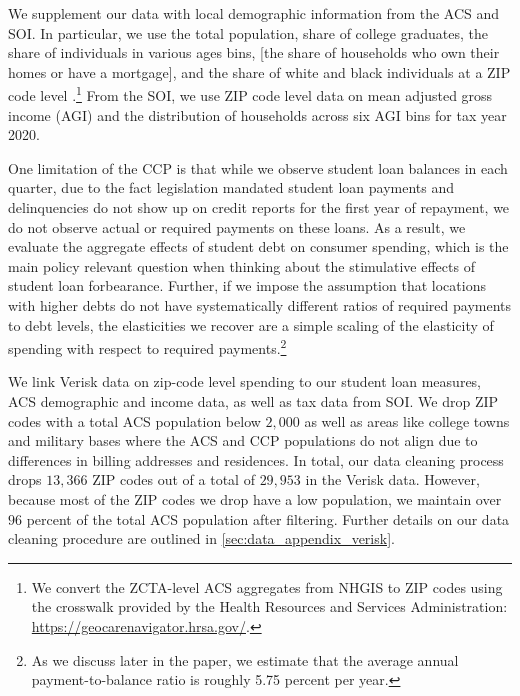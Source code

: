 \documentclass[12pt]{article}
\begin{document}
We supplement our data with local demographic information from  the ACS and SOI.  In particular, we use the total population, share of college graduates, the share of individuals in various ages bins, [the share of households who own their homes or have a mortgage], and the share of white and black individuals at a ZIP code level \citep{ACS_NHGIS}.\footnote{We convert the ZCTA-level ACS aggregates from NHGIS to ZIP codes using the crosswalk provided by the Health Resources and Services Administration: \url{https://geocarenavigator.hrsa.gov/}.}  From the SOI, we use ZIP code level data on mean adjusted gross income (AGI) and the distribution of households across six AGI bins for tax year 2020.%

One limitation of the CCP is that while we observe student loan balances in each quarter, due to the fact legislation mandated student loan payments and delinquencies do not show up on credit reports for the first year of repayment, we do not observe actual or required payments on these loans. As a result, we evaluate the aggregate effects of student debt on consumer spending, which is the main policy relevant question when thinking about the stimulative effects of student loan forbearance. Further, if we impose the assumption that locations with higher debts do not have systematically different ratios of required payments to debt levels, the elasticities we recover are a simple scaling of the elasticity of spending with respect to required payments.\footnote{As we discuss later in the paper, we estimate that the average annual payment-to-balance ratio is roughly 5.75 percent per year.} 

We link Verisk data on zip-code level spending to our student loan measures, ACS demographic and income data, as well as tax data from SOI.  We drop ZIP codes with a total ACS population below $2,000$ as well as areas like college towns and military bases where the ACS and CCP populations do not align due to differences in billing addresses and residences.  In total, our data cleaning process drops $13,366$ ZIP codes out of a total of $29,953$ in the Verisk data. However, because most of the ZIP codes we drop have a low population, we maintain over $96$ percent of the total ACS population after filtering. Further details on our data cleaning procedure are outlined in \ref{sec:data_appendix_verisk}.
\end{document}
